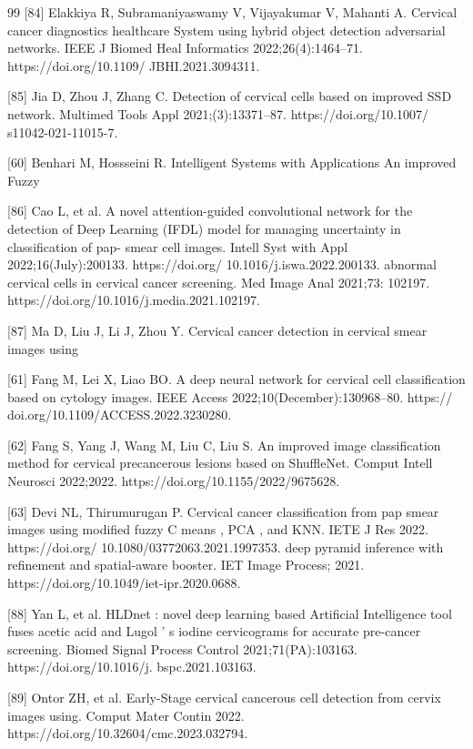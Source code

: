 \documentclass[final,5p,times,twocolumn,authoryear]{elsarticle}
\begin{document}
\begin{thebibliography}{99}
 [84] Elakkiya R, Subramaniyaswamy V, Vijayakumar V, Mahanti A. Cervical cancer diagnostics healthcare System using hybrid object detection adversarial networks. IEEE J Biomed Heal Informatics 2022;26(4):1464–71. https://doi.org/10.1109/ JBHI.2021.3094311.

 [85] Jia D, Zhou J, Zhang C. Detection of cervical cells based on improved SSD network. Multimed Tools Appl 2021;(3):13371–87. https://doi.org/10.1007/ s11042-021-11015-7.

 [60] Benhari M, Hossseini R. Intelligent Systems with Applications An improved Fuzzy

 [86] Cao L, et al. A novel attention-guided convolutional network for the detection of Deep Learning (IFDL) model for managing uncertainty in classification of pap- smear cell images. Intell Syst with Appl 2022;16(July):200133. https://doi.org/ 10.1016/j.iswa.2022.200133. abnormal cervical cells in cervical cancer screening. Med Image Anal 2021;73: 102197. https://doi.org/10.1016/j.media.2021.102197.

 [87] Ma D, Liu J, Li J, Zhou Y. Cervical cancer detection in cervical smear images using

 [61] Fang M, Lei X, Liao BO. A deep neural network for cervical cell classification based on cytology images. IEEE Access 2022;10(December):130968–80. https:// doi.org/10.1109/ACCESS.2022.3230280.

 [62] Fang S, Yang J, Wang M, Liu C, Liu S. An improved image classification method for cervical precancerous lesions based on ShuffleNet. Comput Intell Neurosci 2022;2022. https://doi.org/10.1155/2022/9675628.

 [63] Devi NL, Thirumurugan P. Cervical cancer classification from pap smear images using modified fuzzy C means , PCA , and KNN. IETE J Res 2022. https://doi.org/ 10.1080/03772063.2021.1997353. deep pyramid inference with refinement and spatial-aware booster. IET Image Process; 2021. https://doi.org/10.1049/iet-ipr.2020.0688.

 [88] Yan L, et al. HLDnet : novel deep learning based Artificial Intelligence tool fuses acetic acid and Lugol ’ s iodine cervicograms for accurate pre-cancer screening. Biomed Signal Process Control 2021;71(PA):103163. https://doi.org/10.1016/j. bspc.2021.103163.

 [89] Ontor ZH, et al. Early-Stage cervical cancerous cell detection from cervix images using. Comput Mater Contin 2022. https://doi.org/10.32604/cmc.2023.032794.


\end{thebibliography}
\end{document}
